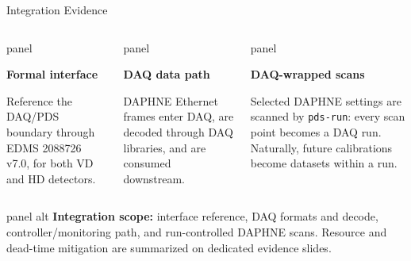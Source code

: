 \documentclass[aspectratio=169,10pt]{beamer}
\newcommand{\panelbox}[3][panel]{%
  \begin{beamercolorbox}[wd=\linewidth,sep=6pt,rounded=true]{#1}
    {\color{noircyan}\bfseries #2\par}
    \vspace{0.5mm}
    {\small #3\par}
  \end{beamercolorbox}
}
\begin{document}
\begin{frame}[t]{Integration Evidence}
\begin{columns}[T,onlytextwidth]
\panelbox{Formal interface}{%
Reference the DAQ/PDS boundary through EDMS 2088726 v7.0, for both VD and HD detectors.}

\panelbox{DAQ data path}{%
DAPHNE Ethernet frames enter DAQ, are decoded through DAQ libraries, and are consumed downstream.}

\panelbox{DAQ-wrapped scans}{%
Selected DAPHNE settings are scanned by \texttt{pds-run}: every scan point becomes a DAQ run. Naturally, future calibrations become datasets within a run.}
\end{columns}

\vspace{2mm}
\begin{beamercolorbox}[wd=\linewidth,sep=6pt,rounded=true]{panel alt}
\footnotesize
\textcolor{noircyan}{\textbf{Integration scope:}} interface reference, DAQ formats and decode, controller/monitoring path, and run-controlled DAPHNE scans. Resource and dead-time mitigation are summarized on dedicated evidence slides.
\end{beamercolorbox}
\end{frame}
\end{document}
